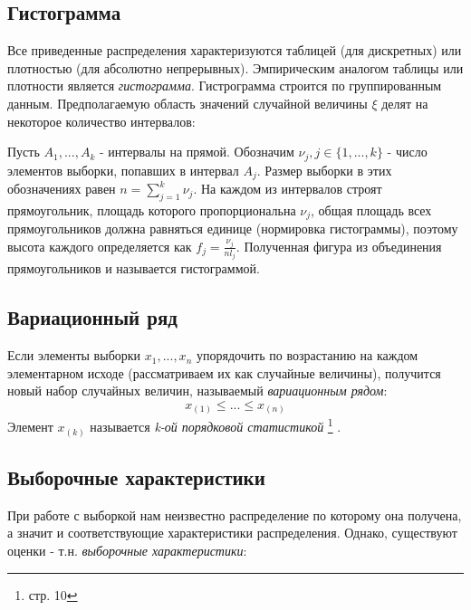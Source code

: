 \documentclass[12pt,a4paper]{article}
\begin{document}
\subsection{Гистограмма}
Все приведенные распределения характеризуются таблицей (для дискретных) или плотностью (для абсолютно непрерывных). Эмпирическим аналогом таблицы или плотности является \textit{гистограмма}\cite{chernova}. Гистрограмма строится по группированным данным. Предполагаемую область значений случайной величины $\xi$ делят на некоторое количество интервалов:

Пусть $A_1, ..., A_k$ - интервалы на прямой. Обозначим $\nu_j,j\in\{1, ..., k\}$ - число элементов выборки, попавших в интервал $A_j$. Размер выборки в этих обозначениях равен $n=\sum\limits_{j=1}^{k}{\nu_j}$. На каждом из интервалов строят прямоугольник, площадь которого пропорциональна $\nu_j$, общая площадь всех прямоугольников должна равняться единице (нормировка гистограммы), поэтому высота каждого определяется как $f_j=\frac{\nu_j}{nl_j}$. Полученная фигура из объединения прямоугольников и называется гистограммой.

\subsection{Вариационный ряд}
Если элементы выборки $x_1, ..., x_n$ упорядочить по возрастанию на каждом элементарном исходе (рассматриваем их как случайные величины), получится новый набор случайных величин, называемый \textit{вариационным рядом}:
$$x_{(1)} \leq ... \leq x_{(n)}$$ Элемент $x_{(k)}$ называется \textit{k-ой порядковой статистикой}
\footnote{\cite{chernova} стр. 10} .

\subsection{Выборочные характеристики}
При работе с выборкой нам неизвестно распределение по которому она получена, а значит и соответствующие характеристики распределения. Однако, существуют оценки - т.н. \textit{выборочные характеристики}:
\end{document}
